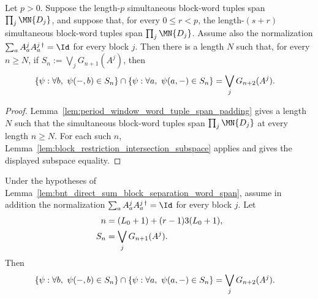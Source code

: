 \begin{lemma}
    \label{lem:period_window_block_restriction_intersection}
    \leanok
    Let $p>0$. Suppose the length-$p$ simultaneous block-word tuples span
    $\prod_j \MN{D_j}$, and suppose that, for every $0\le r<p$, the
    length-$(s+r)$ simultaneous block-word tuples span
    $\prod_j \MN{D_j}$. Assume also the normalization
    $\sum_a A^j_aA^{j\,\dagger}_a=\Id$ for every block $j$. Then there is a
    length $N$ such that, for every $n\ge N$, if
    $S_n:=\bigvee_jG_{n+1}(A^j)$, then
    \begin{align}
        \left\{\psi:\forall b,\ \psi(-,b)\in S_n\right\}
        \cap
        \left\{\psi:\forall a,\ \psi(a,-)\in S_n\right\}
         & =
        \bigvee_jG_{n+2}(A^j). \notag
    \end{align}
\end{lemma}

\begin{proof}
    \leanok
    Lemma~\ref{lem:period_window_word_tuple_span_padding} gives a length $N$
    such that the simultaneous block-word tuples span
    $\prod_j \MN{D_j}$ at every length $n\ge N$. For each such $n$,
    Lemma~\ref{lem:block_restriction_intersection_subspace} applies and gives
    the displayed subspace equality.
\end{proof}

\begin{lemma}
    \label{lem:bnt_direct_sum_block_separation_block_intersection}
    \leanok
    Under the hypotheses of
    Lemma~\ref{lem:bnt_direct_sum_block_separation_word_span}, assume in
    addition the normalization
    $\sum_a A^j_aA^{j\,\dagger}_a=\Id$ for every block $j$. Let
    \begin{align}
        n   & =(L_0+1)+(r-1)3(L_0+1),
        \notag                        \\
        S_n & =\bigvee_jG_{n+1}(A^j).
        \notag
    \end{align}
    Then
    \begin{align}
        \left\{\psi:\forall b,\ \psi(-,b)\in S_n\right\}
        \cap
        \left\{\psi:\forall a,\ \psi(a,-)\in S_n\right\}
         & =
        \bigvee_jG_{n+2}(A^j). \notag
    \end{align}
\end{lemma}

